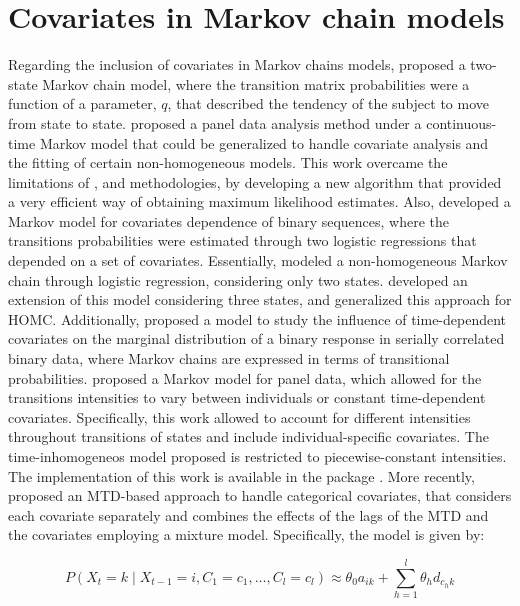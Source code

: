 \section{Covariates in Markov chain models}\label{covariates-in-markov-chain-models}

Regarding the inclusion of covariates in Markov chains models, \citet{Regier1968} proposed a two-state Markov chain model, where the transition matrix probabilities were a function of a parameter, \(q\), that described the tendency of the subject to move from state to state. \citet{Kalbfleisch1985} proposed a panel data analysis method under a continuous-time Markov model that could be generalized to handle covariate analysis and the fitting of certain non-homogeneous models. This work overcame the limitations of \citet{Bart1968}, \citet{Spilerman1976} and \citet{Wasserman1980} methodologies, by developing a new algorithm that provided a very efficient way of obtaining maximum likelihood estimates. Also, \citet{Muenz1985} developed a Markov model for covariates dependence of binary sequences, where the transitions probabilities were estimated through two logistic regressions that depended on a set of covariates. Essentially, \citet{Muenz1985} modeled a non-homogeneous Markov chain through logistic regression, considering only two states. \citet{Islam2004} developed an extension of this model considering three states, and \citet{IslamAtaharul2006} generalized this approach for HOMC. Additionally, \citet{Azzalini1994} proposed a model to study the influence of time-dependent covariates on the marginal distribution of a binary response in serially correlated binary data, where Markov chains are expressed in terms of transitional probabilities. \citet{jackson2011multi} proposed a Markov model for panel data, which allowed for the transitions intensities to vary between individuals or constant time-dependent covariates. Specifically, this work allowed to account for different intensities throughout transitions of states and include individual-specific covariates. The time-inhomogeneos model proposed is restricted to piecewise-constant intensities. The implementation of this work is available in the package . More recently, \citet{Bolano2020} proposed an MTD-based approach to handle categorical covariates, that considers each covariate separately and combines the effects of the lags of the MTD and the covariates employing a mixture model. Specifically, the model is given by:

\begin{equation} 
P(X_t = k \mid X_{t-1} = i, C_1 = c_1, \dots, C_l = c_l) \approx \theta_0 a_{ik} + \sum_{h=1}^l \theta_h d_{c_{h}k} \label{eq:eq7}
\end{equation}

